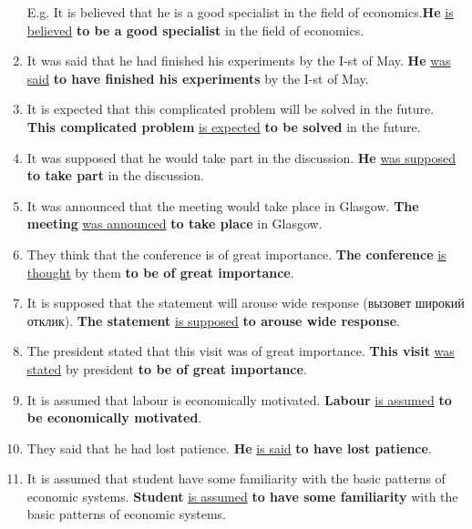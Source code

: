 \documentclass[main.tex]{subfiles}
\begin{document}

\begin{enumerate}[nosep,leftmargin=*]
	\itemsep\eitsp
	\item[E.g.] It is believed that he is a good specialist in the field of economics.\newline \textbf{He} \uline{is believed} \textbf{to be a good specialist} in the field of economics.
	\item It was said that he had finished his experiments by the I-st of May.\newline
		\textbf{He} \uline{was said} \textbf{to have finished his experiments} by the I-st of May.
	\item It is expected that this complicated problem will be solved in the future.\newline
		\textbf{This complicated problem} \uline{is expected} \textbf{to be solved} in the future.
	\item It was supposed that he would take part in the discussion.\newline
		\textbf{He} \uline{was supposed} \textbf{to take part} in the discussion.
	\item It was announced that the meeting would take place in Glasgow.\newline
		\textbf{The meeting} \uline{was announced} \textbf{to take place} in Glasgow.
	\item They think that the conference is of great importance.\newline
		\textbf{The conference} \uline{is thought} by them \textbf{to be of great importance}.
	\item It is supposed that the statement will arouse wide response (вызовет широкий отклик).\newline
		\textbf{The statement} \uline{is supposed} \textbf{to arouse wide response}.
	\item The president stated that this visit was of great importance.\newline
		\textbf{This visit} \uline{was stated} by president \textbf{to be of great importance}.
	\item It is assumed that labour is economically motivated.\newline
		\textbf{Labour} \uline{is assumed} \textbf{to be economically motivated}.
	\item They said that he had lost patience.\newline
		\textbf{He} \uline{is said} \textbf{to have lost patience}.
	\item It is assumed that student have some familiarity with the basic patterns of economic systems.\newline
		\textbf{Student} \uline{is assumed} \textbf{to have some familiarity} with the basic patterns of economic systems.
\end{enumerate}
\ 
\end{document}
